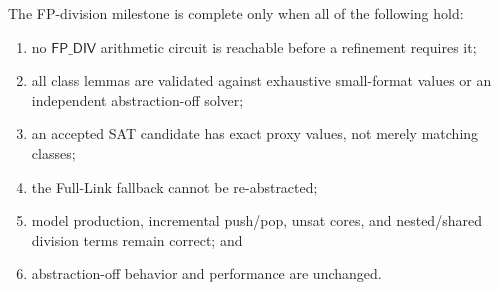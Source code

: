 \documentclass[runningheads]{llncs}
\begin{document}
The FP-division milestone is complete only when all of the following hold:
\begin{enumerate}
  \item no \(\mathsf{FP\_DIV}\) arithmetic circuit is reachable before a
        refinement requires it;
  \item all class lemmas are validated against exhaustive small-format values
        or an independent abstraction-off solver;
  \item an accepted SAT candidate has exact proxy values, not merely matching
        classes;
  \item the Full-Link fallback cannot be re-abstracted;
  \item model production, incremental push/pop, unsat cores, and nested/shared
        division terms remain correct; and
  \item abstraction-off behavior and performance are unchanged.
\end{enumerate}



\end{document}
